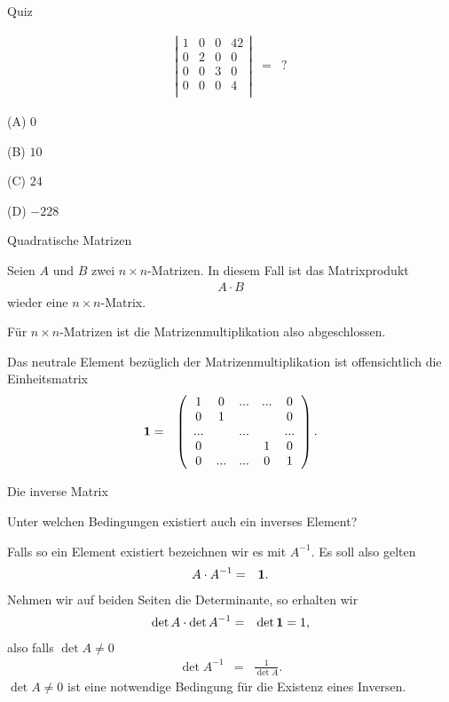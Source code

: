 \documentclass[german]{beamer}
\newcommand{\bq}{\begin{eqnarray*}}
\newcommand{\eq}{\end{eqnarray*}}
\begin{document}
\begin{frame}{Quiz}

\bq
\left| \begin{array}{cccc}
 1 & 0 & 0 & 42 \\
 0 & 2 & 0 & 0 \\
 0 & 0 & 3 & 0 \\
 0 & 0 & 0 & 4 \\
\end{array} \right|
 & = & ?
\eq
\begin{description}
\item{(A)} $0$
\item{(B)} $10$
\item{(C)} $24$
\item{(D)} $-228$
\end{description}

\end{frame}

\begin{frame}{Quadratische Matrizen}

Seien $A$ und $B$ zwei $n \times n$-Matrizen. In diesem Fall ist das Matrixprodukt
\bq
 A \cdot B
\eq
wieder eine $n \times n$-Matrix. 

F\"ur $n \times n$-Matrizen ist die Matrizenmultiplikation also abgeschlossen.

\vspace*{5mm}

Das neutrale Element bez\"uglich der Matrizenmultiplikation ist offensichtlich die Einheitsmatrix
{\small
\bq
 {\bf 1}  & = & 
\left( \begin{array}{ccccc}
 1 & 0 & ... & ... & 0 \\
 0 & 1 & & & 0 \\
 ... & & ... & & ... \\
 0 & & & 1 & 0 \\
 0 & ... & ... & 0 & 1 \\
\end{array} \right).
\eq
}

\end{frame}

\begin{frame}{Die inverse Matrix}

Unter welchen Bedingungen existiert auch ein inverses Element?

Falls so ein Element existiert bezeichnen wir es mit $A^{-1}$. Es soll also gelten
\bq
 A \cdot A^{-1} & = & {\bf 1}.
\eq
Nehmen wir auf beiden Seiten die Determinante, so erhalten wir
\bq
 \det A \cdot \det A^{-1} & = & \det {\bf 1} = 1,
\eq
also falls $\det A \neq 0$
\bq
 \det A^{-1} & = & \frac{1}{\det A}.
\eq
$\det A \neq 0$ ist eine notwendige Bedingung f\"ur die Existenz eines Inversen. 

\end{frame}
\end{document}
